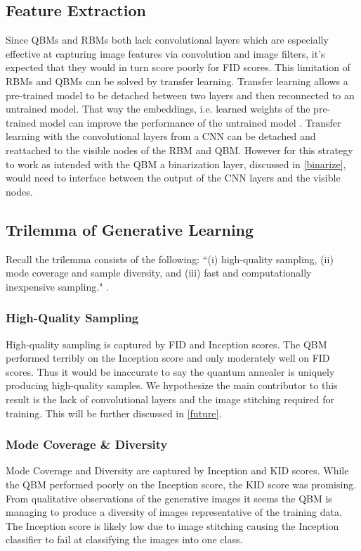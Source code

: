\documentclass[%
 reprint,
 amsmath,amssymb,
 aps,
]{revtex4-2}
\begin{document}
\subsection{Feature Extraction}
Since QBMs and RBMs both lack convolutional layers which are especially effective at capturing image features via convolution and image filters, it's expected that they would in turn score poorly for FID scores. This limitation of RBMs and QBMs can be solved by transfer learning. Transfer learning allows a pre-trained model to be detached between two layers and then reconnected to an untrained model. That way the embeddings, i.e. learned weights of the pre-trained model can improve the performance of the untrained model \cite{transfer}. Transfer learning with the convolutional layers from a CNN can be detached and reattached to the visible nodes of the RBM and QBM. However for this strategy to work as intended with the QBM a binarization layer, discussed in \ref{binarize},  would need to interface between the output of the CNN layers and the visible nodes.


\subsection{Trilemma of Generative Learning}
Recall the trilemma consists of the following: ``(i) high-quality sampling, (ii) mode coverage and sample diversity, and (iii) fast and computationally inexpensive sampling." \cite{xiao2022DDGAN}.

\subsubsection{High-Quality Sampling}
High-quality sampling is captured by FID and Inception scores. The QBM performed terribly on the Inception score and only moderately well on FID scores. Thus it would be inaccurate to say the quantum annealer is uniquely producing high-quality samples. We hypothesize the main contributor to this result is the lack of convolutional layers and the image stitching required for training. This will be further discussed in \ref{future}.

\subsubsection{Mode Coverage \& Diversity}
Mode Coverage and Diversity are captured by Inception and KID scores. While the QBM performed poorly on the Inception score, the KID score was promising. From qualitative observations of the generative images it seems the QBM is managing to produce a diversity of images representative of the training data. The Inception score is likely low due to image stitching causing the Inception classifier to fail at classifying the images into one class.
\end{document}
